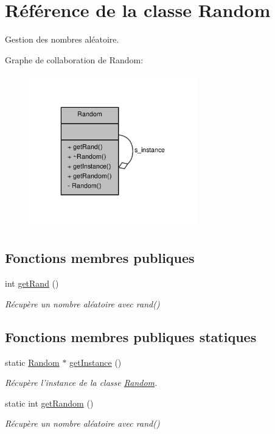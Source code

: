\hypertarget{class_random}{\section{Référence de la classe Random}
\label{class_random}
}


Gestion des nombres aléatoire.  




Graphe de collaboration de Random\-:
\nopagebreak
\begin{figure}[H]
\begin{center}
\leavevmode
\includegraphics[width=208pt]{class_random__coll__graph}
\end{center}
\end{figure}
\subsection*{Fonctions membres publiques}
\begin{DoxyCompactItemize}
\item 
int \hyperlink{class_random_aa317d7d010796e711fe9b7ee9065785a}{get\-Rand} ()
\begin{DoxyCompactList}\small\item\em Récupère un nombre aléatoire avec rand() \end{DoxyCompactList}\end{DoxyCompactItemize}
\subsection*{Fonctions membres publiques statiques}
\begin{DoxyCompactItemize}
\item 
static \hyperlink{class_random}{Random} $\ast$ \hyperlink{class_random_a5d14d1731d76c3a4d9841842fa70580d}{get\-Instance} ()
\begin{DoxyCompactList}\small\item\em Récupère l'instance de la classe \hyperlink{class_random}{Random}. \end{DoxyCompactList}\item 
static int \hyperlink{class_random_a0a96dee9126a2267d9736047aff44958}{get\-Random} ()
\begin{DoxyCompactList}\small\item\em Récupère un nombre aléatoire avec rand() \end{DoxyCompactList}\end{DoxyCompactItemize}

